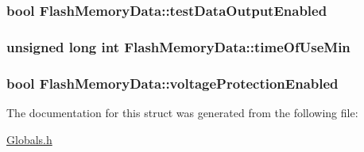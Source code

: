 \subsubsection[{\texorpdfstring{test\+Data\+Output\+Enabled}{testDataOutputEnabled}}]{\setlength{\rightskip}{0pt plus 5cm}bool Flash\+Memory\+Data\+::test\+Data\+Output\+Enabled}\hypertarget{structFlashMemoryData_adcf63c0ba25e843a3e2e0e0f1bcad4e8}{}\label{structFlashMemoryData_adcf63c0ba25e843a3e2e0e0f1bcad4e8}
\subsubsection[{\texorpdfstring{time\+Of\+Use\+Min}{timeOfUseMin}}]{\setlength{\rightskip}{0pt plus 5cm}unsigned long int Flash\+Memory\+Data\+::time\+Of\+Use\+Min}\hypertarget{structFlashMemoryData_a4bec4294af40d5b6ff0949a7c0af9620}{}\label{structFlashMemoryData_a4bec4294af40d5b6ff0949a7c0af9620}
\subsubsection[{\texorpdfstring{voltage\+Protection\+Enabled}{voltageProtectionEnabled}}]{\setlength{\rightskip}{0pt plus 5cm}bool Flash\+Memory\+Data\+::voltage\+Protection\+Enabled}\hypertarget{structFlashMemoryData_a3b5553fc5eb53805c6f10a7c1a80dd83}{}\label{structFlashMemoryData_a3b5553fc5eb53805c6f10a7c1a80dd83}


The documentation for this struct was generated from the following file\+:\begin{DoxyCompactItemize}
\item 
\hyperlink{Globals_8h}{Globals.\+h}\end{DoxyCompactItemize}
